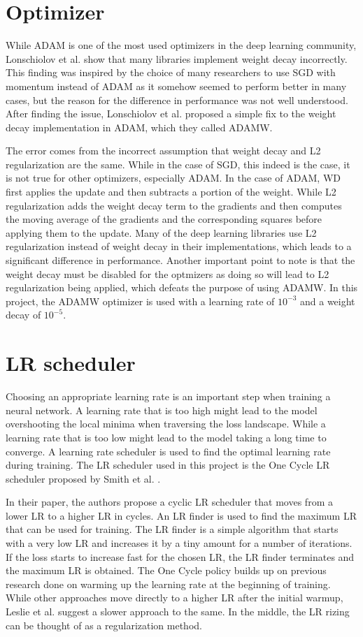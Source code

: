\section{Optimizer}
While ADAM \cite{kingmaAdamMethodStochastic2014} is one of the most used optimizers in the deep learning community, Lonschiolov et al. \cite{loshchilovDecoupledWeightDecay2019} show that many libraries implement weight decay incorrectly. This finding was inspired by the choice of many researchers to use SGD with momentum instead of ADAM as it somehow seemed to perform better in many cases, but the reason for the difference in performance was not well understood. After finding the issue, Lonschiolov et al. proposed a simple fix to the weight decay implementation in ADAM, which they called ADAMW.

The error comes from the incorrect assumption that weight decay and L2 regularization are the same. While in the case of SGD, this indeed is the case, it is not true for other optimizers, especially ADAM. In the case of ADAM, WD first applies the update and then subtracts a portion of the weight. While L2 regularization adds the weight decay term to the gradients and then computes the moving average of the gradients and the corresponding squares before applying them to the update. Many of the deep learning libraries use L2 regularization instead of weight decay in their implementations, which leads to a significant difference in performance. Another important point to note is that the weight decay must be disabled for the optmizers as doing so will lead to L2 regularization being applied, which defeats the purpose of using ADAMW.
In this project, the ADAMW optimizer is used with a learning rate of $10^{-3}$ and a weight decay of $10^{-5}$.

\section{LR scheduler}
Choosing an appropriate learning rate is an important step when training a neural network. A learning rate that is too high might lead to the model overshooting the local minima when traversing the loss landscape. While a learning rate that is too low might lead to the model taking a long time to converge. A learning rate scheduler is used to find the optimal learning rate during training. The LR scheduler used in this project is the One Cycle LR scheduler proposed by Smith et al. \cite{smithSuperConvergenceVeryFast2018}.

In their paper, the authors propose a cyclic LR scheduler that moves from a lower LR to a higher LR in cycles. An LR finder is used to find the maximum LR that can be used for training. The LR finder is a simple algorithm that starts with a very low LR and increases it by a tiny amount for a number of iterations. If the loss starts to increase fast for the chosen LR, the LR finder terminates and the maximum LR is obtained. 
The One Cycle policy builds up on previous research done on warming up the learning rate at the beginning of training. While other approaches move directly to a higher LR after the initial warmup, Leslie et al. suggest a slower approach to the same. In the middle, the LR rizing can be thought of as a regularization method.

